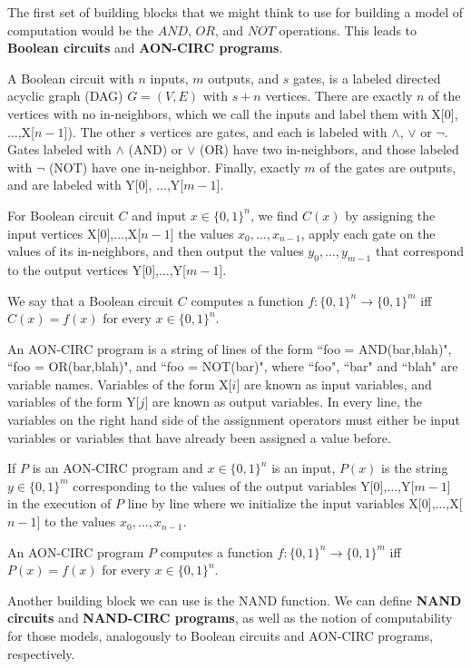 \documentclass[11pt]{article}
\theoremstyle{definition}
\theoremstyle{remark}
\begin{document}
The first set of building blocks that we might think to use for building a model of computation would be the $AND$, $OR$, and $NOT$ operations. This leads to \textbf{Boolean circuits} and \textbf{AON-CIRC programs}.

A Boolean circuit with $n$ inputs, $m$ outputs, and $s$ gates, is a labeled directed acyclic graph (DAG) $G=(V,E)$ with $s+n$ vertices. There are exactly $n$ of the vertices with no in-neighbors, which we call the inputs and label them with X[$0$],$\ldots$,X[$n-1$]). The other $s$ vertices are gates, and each is labeled with $\wedge$, $\vee$ or $\neg$. Gates labeled with $\wedge$ (AND) or $\vee$ (OR) have two in-neighbors, and those labeled with $\neg$ (NOT) have one in-neighbor. Finally, 
exactly $m$ of the gates are outputs, and are labeled with Y[$0$], $\ldots$,Y[$m-1$].

For Boolean circuit $C$ and input $x \in \{0,1\}^n$, we find $C(x)$ by assigning the input vertices X[$0$],$\ldots$,X[$n-1$] the values $x_0,\ldots,x_{n-1}$, apply each gate on the values of its in-neighbors, and then output the values $y_0,\ldots,y_{m-1}$ that correspond to the output vertices Y[$0$],$\ldots$,Y[$m-1$]. 

We say that a Boolean circuit $C$ computes a function $f:\{0,1\}^n \rightarrow \{0,1\}^m$ iff $C(x)=f(x)$ for every $x\in \{0,1\}^n$. 

An AON-CIRC program is a string of lines of the form ``foo = AND(bar,blah)", ``foo = OR(bar,blah)", and ``foo = NOT(bar)", where ``foo", ``bar" and ``blah" are variable names. Variables of the form X[$i$] are known as input variables, and variables of the form Y[$j$] are known as output variables. In every line, the variables on the right hand side of the assignment operators must either be input variables or variables that have already been assigned a value before.

If $P$ is an AON-CIRC program and $x\in \{0,1\}^n$ is an input, $P(x)$ is the string $y\in \{0,1\}^m$ corresponding to the values of the output variables Y[$0$],$\ldots$,Y[$m-1$] in the execution of $P$ line by line where we initialize the input variables X[$0$],$\ldots$,X[$n-1$] to the values $x_0,\ldots,x_{n-1}$.

An AON-CIRC program $P$ computes a function $f:\{0,1\}^n \rightarrow \{0,1\}^m$ iff $P(x)=f(x)$ for every $x\in \{0,1\}^n$.

Another building block we can use is the NAND function. We can define \textbf{NAND circuits} and \textbf{NAND-CIRC programs}, as well as the notion of computability for those models, analogously to Boolean circuits and AON-CIRC programs, respectively.
\end{document}
